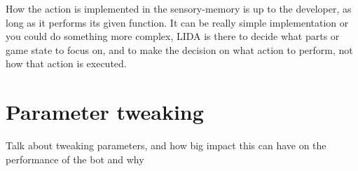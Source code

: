 How the action is implemented in the sensory-memory is up to the developer, as long as it performs its given function. It can be really simple implementation or you could do something more complex, LIDA is there to decide what parts or game state to focus on, and to make the decision on what action to perform, not how that action is executed.

\section{Parameter tweaking}
Talk about tweaking parameters, and how big impact this can have on the performance of the bot and why